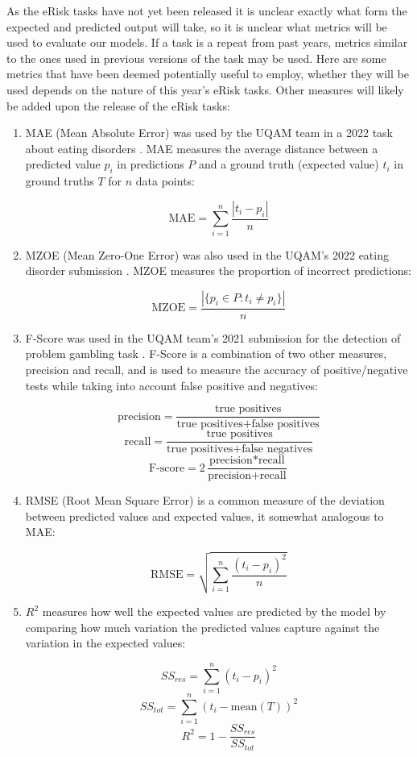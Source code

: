 \documentclass[12pt, titlepage]{article}
\begin{document}
 \label{metrics}

As the eRisk tasks have not yet been released it is unclear exactly what form the expected and predicted output will take, so it is unclear what metrics will be used to evaluate our models. If a task is a repeat from past years, metrics similar to the ones used in previous versions of the task may be used. Here are some metrics that have been deemed potentially useful to employ, whether they will be used depends on the nature of this year's eRisk tasks. Other measures will likely be added upon the release of the eRisk tasks:

\begin{enumerate}

\item{MAE} (Mean Absolute Error) was used by the UQAM team in a 2022 task about eating disorders \citep{Saravani2022MeasuringTS}. MAE measures the average distance between a predicted value $p_i$ in predictions $P$ and a ground truth (expected value) $t_i$ in ground truths $T$ for $n$ data points:

$$\text{MAE} = \sum_{i=1}^{n} \frac{|t_i - p_i|}{n}$$

\item{MZOE} (Mean Zero-One Error) was also used in the UQAM's 2022 eating disorder submission \citep{Saravani2022MeasuringTS}. MZOE measures the proportion of incorrect predictions:

$$\text{MZOE} = \frac{|\{p_i \in P : t_i \neq p_i\}|}{n}$$

\item{F-Score} was used in the UQAM team's 2021 submission for the detection of problem gambling task \citep{Maupom2021EarlyDO}. F-Score is a combination of two other measures, precision and recall, and is used to measure the accuracy of positive/negative tests while taking into account false positive and negatives:

$$\text{precision} = \frac{\text{true positives}}{\text{true positives} + \text{false positives}}$$
$$\text{recall} = \frac{\text{true positives}}{\text{true positives} + \text{false negatives}}$$
$$\text{F-score} = 2\frac{\text{precision} * \text{recall}}{\text{precision} + \text{recall}}$$

\item{RMSE} (Root Mean Square Error) is a common measure of the deviation between predicted values and expected values, it somewhat analogous to MAE:

$$\text{RMSE} = \sqrt{\sum_{i=1}^{n} \frac{(t_i - p_i)^2}{n}}$$

\item{$R^2$} measures how well the expected values are predicted by the model by comparing how much variation the predicted values capture against the variation in the expected values:

$$SS_{res} = \sum_{i=1}^{n} (t_i - p_i)^2$$
$$SS_{tot} = \sum_{i=1}^{n} (t_i - \text{mean}(T))^2$$
$$R^2 = 1 - \frac{SS_{res}}{SS_{tot}}$$

\end{enumerate}
\end{document}
